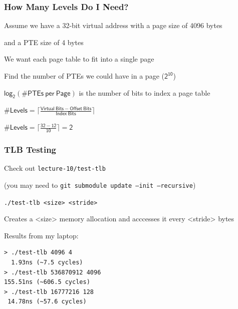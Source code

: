   \begin{frame}
    \frametitle{How Many Levels Do I Need?}

    Assume we have a 32-bit virtual address with a page size of 4096 bytes

    \hspace{2em} and a PTE size of 4 bytes

    \vspace{2em}

    We want each page table to fit into a single page

    \hspace{2em} Find the number of PTEs we could have in a page ($\mathsf{2^{10}}$)

    \hspace{4em} $\mathsf{log_2(\# PTEs\ per\ Page)}$ is the number of bits to index a page table

    \vspace{2em}

    $\mathsf{\# Levels = \lceil \frac{Virtual\ Bits - Offset\ Bits}{Index\ Bits} \rceil}$

    \vspace{2em}

    $\mathsf{\# Levels = \lceil \frac{32 - 12}{10} \rceil = 2}$
  \end{frame}

  \begin{frame}[fragile]
    \frametitle{TLB Testing}

    Check out \texttt{lecture-10/test-tlb}

    \hspace{2em} (you may need to \texttt{git submodule update --init --recursive})

    \vspace{2em}

    \texttt{./test-tlb <size> <stride>}

    \hspace{2em} Creates a <size> memory allocation and acccesses it every <stride> bytes

    \vspace{2em}

    Results from my laptop:

    \begin{lstlisting}
> ./test-tlb 4096 4        
  1.93ns (~7.5 cycles)
> ./test-tlb 536870912 4096
155.51ns (~606.5 cycles)
> ./test-tlb 16777216 128  
 14.78ns (~57.6 cycles)
    \end{lstlisting}
  \end{frame}

